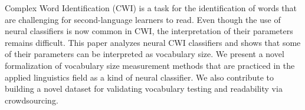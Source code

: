 Complex Word Identification (CWI) is a task for the identification of words that are challenging for second-language learners to read. Even though the use of neural classifiers is now common in CWI, the interpretation of their parameters remains difficult. This paper analyzes neural CWI classifiers and shows that some of their parameters can be interpreted as vocabulary size. We present a novel formalization of vocabulary size measurement methods that are practiced in the applied linguistics field as a kind of neural classifier. We also contribute to building a novel dataset for validating vocabulary testing and readability via crowdsourcing.
